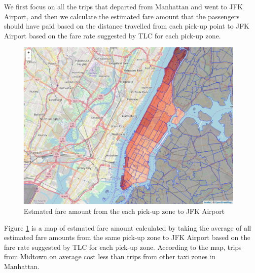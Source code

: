 \documentclass[12pt,twoside]{reedthesis}
\theoremstyle{definition}
\theoremstyle{definition}
\theoremstyle{definition}
\theoremstyle{remark}
\begin{document}
We first focus on all the trips that departed from Manhattan and went to
JFK Airport, and then we calculate the estimated fare amount that the
passengers should have paid based on the distance travelled from each
pick-up point to JFK Airport based on the fare rate suggested by TLC for
each pick-up zone.
\begin{figure}[h]

{\centering \includegraphics[width=5.84in]{figure/to_jfk_fare_vis} 

}

\caption{Estmated fare amount from the each pick-up zone to JFK Airport}\label{fig:to-jfk-fare-vis}
\end{figure}
Figure \ref{fig:to-jfk-fare-vis} is a map of estmated fare amount
calculated by taking the average of all estimated fare amounts from the
same pick-up zone to JFK Airport based on the fare rate suggested by TLC
for each pick-up zone. According to the map, trips from Midtown on
average cost less than trips from other taxi zones in Manhattan.
\end{document}
